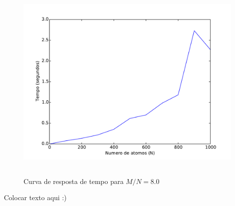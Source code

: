 		\begin{figure}[H]
			\centering
			\includegraphics[height=10cm]{images/max2sat_mn80}
			\caption{Curva de resposta de tempo para $M/N=8.0$}
			\label{fig:max2satmn80}
		\end{figure}
		Colocar texto aqui :)
\clearpage 
